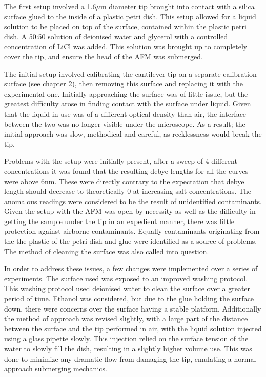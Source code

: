 The first setup involved a 1.6$\mu$m diameter tip brought into contact with a silica surface glued to the  inside of a plastic petri dish. This setup allowed for a liquid solution to be placed on top of the surface, contained within the plastic petri dish. A 50:50 solution of deionised water and glycerol with a controlled concentration of LiCl was added. This solution was brought up to completely cover the tip, and ensure the head of the AFM was submerged.

The initial setup involved calibrating the cantilever tip on a separate calibration surface (see chapter 2), then removing this surface and replacing it with the experimental one. Initially approaching the surface was of little issue, but the greatest difficulty arose in finding contact with the surface under liquid. Given that the liquid in use was of a different optical density than air, the interface between the two was no longer visible under the microscope. As a result; the initial approach was slow, methodical and careful, as recklessness would break the tip. 

Problems with the setup were initially present, after a sweep of 4 different concentrations it was found that the resulting debye lengths for all the curves were above 6nm. These were directly contrary to the expectation that debye length should decrease to theoretically 0 at increasing salt concentrations.  The anomalous readings were considered to be the result of unidentified contaminants. Given the setup with the AFM was open by necessity as well as the difficulty in getting the sample under the tip in an expedient manner, there was little protection against airborne contaminants. Equally contaminants originating from the the plastic of the petri dish and glue were identified as a source of problems. The method of cleaning the surface was also called into question. %

In order to address these issues, a few changes were implemented over a series of experiments. The surface used was exposed to an improved washing protocol. This washing protocol used deionised water to clean the surface over a greater period of time. Ethanol was considered, but due to the glue holding the surface down, there were concerns over the surface having a stable platform. Additionally the method of approach was revised slightly, with a large part of the distance between the surface and the tip performed in air, with the liquid solution injected using a glass pipette slowly. This injection relied on the surface tension of the water to slowly fill the dish, resulting in a slightly higher volume use. This was done to minimize any dramatic flow from damaging the tip, emulating a normal approach submerging mechanics. %

